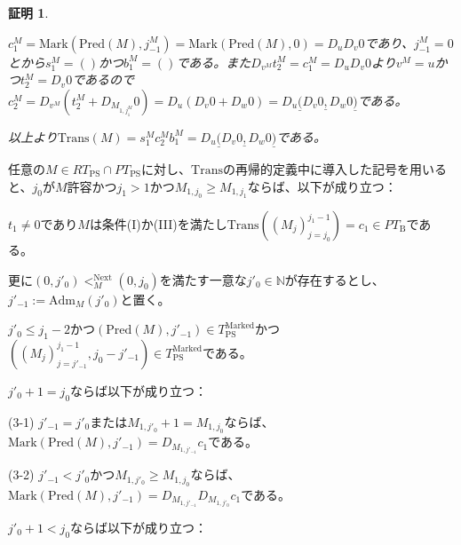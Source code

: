 \documentclass[dvipdfmx,uplatex]{jsarticle}
\theoremstyle{customnonumberbreakfortheorem}
\theoremstyle{customnonumberbreakforproof}
\newtheorem{hideableproof}{証明}
\begin{document}
\begin{hideableproof}
\begin{indented}
\begin{indented}
			\item \(c_1^M = \textrm{Mark}(\textrm{Pred}(M),j_{-1}^M) = \textrm{Mark}(\textrm{Pred}(M),0) = D_u D_v 0\)であり、\(j_{-1}^M = 0\)とから\(s_1^M = ()\)かつ\(b_1^M = ()\)である。また\(D_{v^M} t_2^M = c_1^M = D_u D_v 0\)より\(v^M = u\)かつ\(t_2^M = D_v 0\)であるので\(c_2^M = D_{v^M}(t_2^M + D_{M_{1,j_1^M}} 0) = D_u(D_v 0 + D_w 0) = D_u \underline{(} D_v 0 \underline{,} D_w 0 \underline{)}\)である。
			\item 以上より\(\textrm{Trans}(M) = s_1^M c_2^M b_1^M = D_u \underline{(} D_v 0 \underline{,} D_w 0 \underline{)}\)である。
		\end{indented}
	\end{indented}
\end{hideableproof}

\begin{lemma}\label{条件(I)か(III)の下でのc_1前後の具体表示}
	任意の\(M \in RT_{\textrm{PS}} \cap PT_{\textrm{PS}}\)に対し、\(\textrm{Trans}\)の再帰的定義中に導入した記号を用いると、\(j_0\)が\(M\)許容かつ\(j_1 > 1\)かつ\(M_{1,j_0} \geq M_{1,j_1}\)ならば、以下が成り立つ：
	\begin{penumerate}
		\item \(t_1 \neq 0\)であり\(M\)は条件(I)か(III)を満たし\(\textrm{Trans}((M_j)_{j=j_0}^{j_1-1}) = c_1 \in PT_{\textrm{B}}\)である。
	\end{penumerate}
	更に\((0,j'_0) <_M^{\textrm{Next}} (0,j_0)\)を満たす一意な\(j'_0 \in \mathbb{N}\)が存在するとし、\(j'_{-1} := \textrm{Adm}_M(j'_0)\)と置く。
	\begin{penumerate}
		\setcounter{penumeratei}{1}
		\item \(j'_0 \leq j_1-2\)かつ\((\textrm{Pred}(M),j'_{-1}) \in T_{\textrm{PS}}^{\textrm{Marked}}\)かつ\(((M_j)_{j=j'_{-1}}^{j_1-1},j_0-j'_{-1}) \in T_{\textrm{PS}}^{\textrm{Marked}}\)である。
		\item \(j'_0+1 = j_0\)ならば以下が成り立つ：
		\begin{indented}
			\item[(3-1)] \(j'_{-1} = j'_0\)または\(M_{1,j'_0}+1 = M_{1,j_0}\)ならば、\(\textrm{Mark}(\textrm{Pred}(M),j'_{-1}) = D_{M_{1,j'_{-1}}} c_1\)である。
			\item[(3-2)] \(j'_{-1} < j'_0\)かつ\(M_{1,j'_0} \geq M_{1,j_0}\)ならば、\(\textrm{Mark}(\textrm{Pred}(M),j'_{-1}) = D_{M_{1,j'_{-1}}} D_{M_{1,j'_0}} c_1\)である。
		\end{indented}
		\item \(j'_0+1 < j_0\)ならば以下が成り立つ：

\end{penumerate}
\end{lemma}
\end{document}
